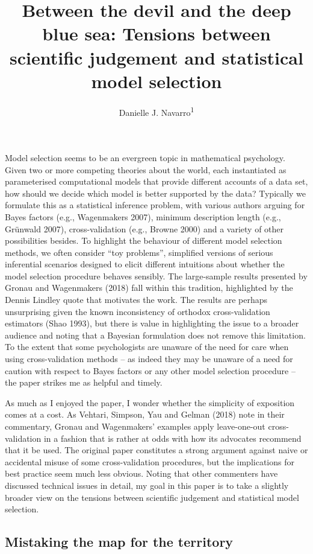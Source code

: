 \documentclass[doc]{apa6}
\title{Between the devil and the deep blue sea: Tensions between scientific
judgement and statistical model selection}
\author{Danielle J. Navarro\textsuperscript{1}}
\date{}
\affiliation{
\vspace{0.5cm}
\textsuperscript{1} University of New South Wales}
\theoremstyle{definition}
\theoremstyle{definition}
\theoremstyle{definition}
\theoremstyle{remark}
\begin{document}
\maketitle

Model selection seems to be an evergreen topic in mathematical
psychology. Given two or more competing theories about the world, each
instantiated as parameterised computational models that provide
different accounts of a data set, how should we decide which model is
better supported by the data? Typically we formulate this as a
statistical inference problem, with various authors arguing for Bayes
factors (e.g., Wagenmakers 2007), minimum description length (e.g.,
Grünwald 2007), cross-validation (e.g., Browne 2000) and a variety of
other possibilities besides. To highlight the behaviour of different
model selection methods, we often consider \enquote{toy problems},
simplified versions of serious inferential scenarios designed to elicit
different intuitions about whether the model selection procedure behaves
sensibly. The large-sample results presented by Gronau and Wagenmakers
(2018) fall within this tradition, highlighted by the Dennis Lindley
quote that motivates the work. The results are perhaps unsurprising
given the known inconsistency of orthodox cross-validation estimators
(Shao 1993), but there is value in highlighting the issue to a broader
audience and noting that a Bayesian formulation does not remove this
limitation. To the extent that some psychologists are unaware of the
need for care when using cross-validation methods -- as indeed they may
be unaware of a need for caution with respect to Bayes factors or any
other model selection procedure -- the paper strikes me as helpful and
timely.

As much as I enjoyed the paper, I wonder whether the simplicity of
exposition comes at a cost. As Vehtari, Simpson, Yau and Gelman (2018)
note in their commentary, Gronau and Wagenmakers' examples apply
leave-one-out cross-validation in a fashion that is rather at odds with
how its advocates recommend that it be used. The original paper
constitutes a strong argument against naive or accidental misuse of some
cross-validation procedures, but the implications for best practice seem
much less obvious. Noting that other commenters have discussed technical
issues in detail, my goal in this paper is to take a slightly broader
view on the tensions between scientific judgement and statistical model
selection.

\subsection{Mistaking the map for the
territory}\label{mistaking-the-map-for-the-territory}
\end{document}
